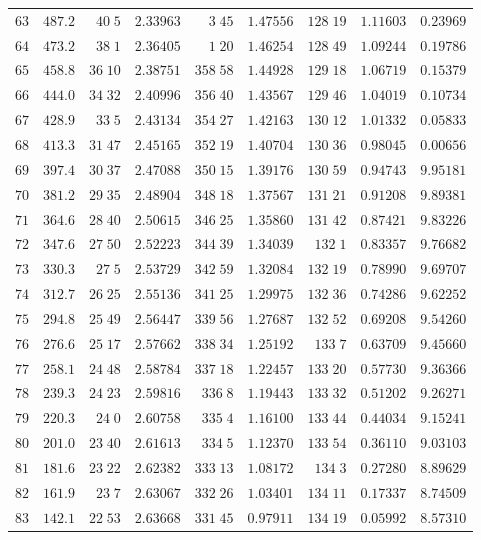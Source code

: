\begin{center}
\begin{tabular}{r|r|r|r|r|r|r|r|r}
$63$&$487.2$&$40\;5$&$2.33963$&$3\;45$&$1.47556$&$128\;19$&$1.11603$&$0.23969$\\
$64$&$473.2$&$38\;1$&$2.36405$&$1\;20$&$1.46254$&$128\;49$&$1.09244$&$0.19786$\\[2pt]
$65$&$458.8$&$36\;10$&$2.38751$&$358\;58$&$1.44928$&$129\;18$&$1.06719$&$0.15379$\\
$66$&$444.0$&$34\;32$&$2.40996$&$356\;40$&$1.43567$&$129\;46$&$1.04019$&$0.10734$\\
$67$&$428.9$&$33\;5$&$2.43134$&$354\;27$&$1.42163$&$130\;12$&$1.01332$&$0.05833$\\
$68$&$413.3$&$31\;47$&$2.45165$&$352\;19$&$1.40704$&$130\;36$&$0.98045$&$0.00656$\\
$69$&$397.4$&$30\;37$&$2.47088$&$350\;15$&$1.39176$&$130\;59$&$0.94743$&$9.95181$\\[2pt]
$70$&$381.2$&$29\;35$&$2.48904$&$348\;18$&$1.37567$&$131\;21$&$0.91208$&$9.89381$\\
$71$&$364.6$&$28\;40$&$2.50615$&$346\;25$&$1.35860$&$131\;42$&$0.87421$&$9.83226$\\
$72$&$347.6$&$27\;50$&$2.52223$&$344\;39$&$1.34039$&$132\;1$&$0.83357$&$9.76682$\\
$73$&$330.3$&$27\;5$&$2.53729$&$342\;59$&$1.32084$&$132\;19$&$0.78990$&$9.69707$\\
$74$&$312.7$&$26\;25$&$2.55136$&$341\;25$&$1.29975$&$132\;36$&$0.74286$&$9.62252$\\[2pt]
$75$&$294.8$&$25\;49$&$2.56447$&$339\;56$&$1.27687$&$132\;52$&$0.69208$&$9.54260$\\
$76$&$276.6$&$25\;17$&$2.57662$&$338\;34$&$1.25192$&$133\;7$&$0.63709$&$9.45660$\\
$77$&$258.1$&$24\;48$&$2.58784$&$337\;18$&$1.22457$&$133\;20$&$0.57730$&$9.36366$\\
$78$&$239.3$&$24\;23$&$2.59816$&$336\;8$&$1.19443$&$133\;32$&$0.51202$&$9.26271$\\
$79$&$220.3$&$24\;0$&$2.60758$&$335\;4$&$1.16100$&$133\;44$&$0.44034$&$9.15241$\\[2pt]
$80$&$201.0$&$23\;40$&$2.61613$&$334\;5$&$1.12370$&$133\;54$&$0.36110$&$9.03103$\\
$81$&$181.6$&$23\;22$&$2.62382$&$333\;13$&$1.08172$&$134\;3$&$0.27280$&$8.89629$\\
$82$&$161.9$&$23\;7$&$2.63067$&$332\;26$&$1.03401$&$134\;11$&$0.17337$&$8.74509$\\
$83$&$142.1$&$22\;53$&$2.63668$&$331\;45$&$0.97911$&$134\;19$&$0.05992$&$8.57310$\\

\end{tabular}
\end{center}
